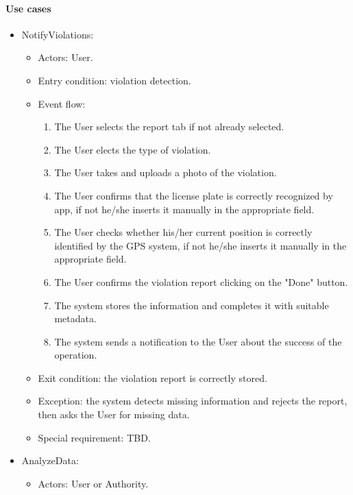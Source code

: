 \documentclass[12pt]{article}
\begin{document}
        \paragraph{Use cases}
        \begin{itemize}
            \item NotifyViolations:
            \begin{itemize}
                \item Actors: User.
                \item Entry condition: violation detection.
                \item Event flow:
                \begin{enumerate}
                    \item The User selects the report tab if not already selected.
                    \item The User elects the type of violation.
                    \item The User takes and uploads a photo of the violation.
                    \item The User confirms that the license plate is correctly recognized by app, if not he/she inserts it manually in the appropriate field.
                    \item The User checks whether his/her current position is correctly identified by the GPS system, if not he/she inserts it manually in the appropriate field.
                    \item The User confirms the violation report clicking on the "Done" button.
                    \item The system stores the information and completes it with suitable metadata.
                    \item The system sends a notification to the User about the success of the operation.
                \end{enumerate}
                \item Exit condition: the violation report is correctly stored.
                \item Exception: the system detects missing information and rejects the report, then asks the User for missing data.
                \item Special requirement: TBD.
            \end{itemize}
            \item AnalyzeData:
            \begin{itemize}
                \item Actors: User or Authority.

\end{itemize}
\end{itemize}
\end{document}
